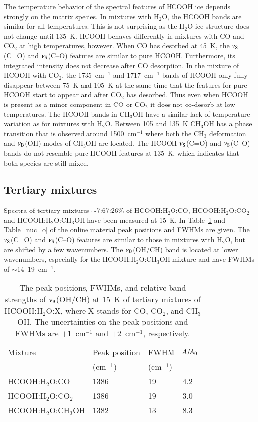 \documentclass{aa}
\begin{document}
The temperature behavior of the spectral features of HCOOH ice depends
strongly on the matrix species. In mixtures with H$_2$O, the HCOOH
bands are similar for all temperatures. This is not surprising as the
H$_2$O ice structure does not change until 135~K. HCOOH behaves
differently in mixtures with CO and CO$_2$ at high temperatures,
however. When CO has desorbed at 45~K, the $\nu_{\rm S}$(C=O) and
$\nu_{\rm S}$(C--O) features are similar to pure HCOOH. Furthermore,
its integrated intensity does not decrease after CO desorption. In the
mixture of HCOOH with CO$_2$, the 1735~cm$^{-1}$ and 1717~cm$^{-1}$
bands of HCOOH only fully disappear between 75~K and 105~K at the same
time that the features for pure HCOOH start to appear and after CO$_2$
has desorbed. Thus even when HCOOH is present as a minor component in
CO or CO$_2$ it does not co-desorb at low temperatures. The HCOOH
bands in CH$_3$OH have a similar lack of temperature variation as for
mixtures with H$_2$O. Between 105 and 135~K CH$_3$OH has a phase
transition that is observed around 1500~cm$^{-1}$ where both the
CH$_3$ deformation and $\nu_{\rm B}$(OH) modes of CH$_3$OH are
located. The HCOOH $\nu_{\rm S}$(C=O) and $\nu_{\rm S}$(C--O) bands do
not resemble pure HCOOH features at 135~K, which indicates that both
species are still mixed.

\subsection{Tertiary mixtures}
\label{tert}

Spectra of tertiary mixtures $\sim$7:67:26\% of HCOOH:H$_2$O:CO,
HCOOH:H$_2$O:CO$_2$ and HCOOH:H$_2$O:CH$_3$OH have been measured at
15~K. In Table~\ref{ppmix} and Table~\ref{nuc=o} of the online
material peak positions and FWHMs are given. The $\nu_{\rm S}$(C=O)
and $\nu_{\rm S}$(C--O) features are similar to those in mixtures with
H$_2$O, but are shifted by a few wavenumbers. The $\nu_{\rm B}$(OH/CH)
band is located at lower wavenumbers, especially for the
HCOOH:H$_2$O:CH$_3$OH mixture and have FWHMs of
$\sim$14--19~cm$^{-1}$.

\begin{table}
\caption{The peak positions, FWHMs, and relative band strengths of
$\nu_{\rm B}$(OH/CH) at 15~K of tertiary mixtures of HCOOH:H$_2$O:X,
where X stands for CO, CO$_2$, and CH$_3$OH. The uncertainties on the
peak positions and FWHMs are $\pm$1~cm$^{-1}$ and $\pm$2~cm$^{-1}$,
respectively.}\label{ppmix}
\begin{tabular}{llll}
\hline
\hline
Mixture & Peak position & FWHM & $A/A_{\rm 0}$\\
        & (cm$^{-1}$)   & (cm$^{-1}$) & \\
\hline
HCOOH:H$_2$O:CO & 1386 & 19   & 4.2\\
HCOOH:H$_2$O:CO$_2$ & 1386 & 19  & 3.0\\
HCOOH:H$_2$O:CH$_3$OH & 1382 & 13 & 8.3\\ 
\hline
\end{tabular}
\end{table}
\end{document}
